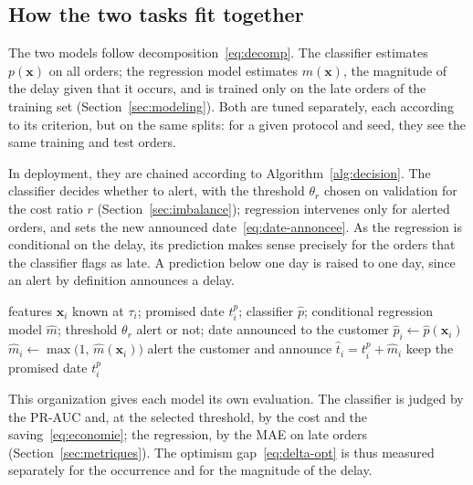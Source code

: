 \documentclass[11pt,a4paper]{article}
\theoremstyle{definition}
\begin{document}
\subsection{How the two tasks fit together}
\label{sec:articulation}

The two models follow decomposition~\eqref{eq:decomp}. The classifier estimates $p(\mathbf{x})$ on all orders; the regression model estimates $m(\mathbf{x})$, the magnitude of the delay given that it occurs, and is trained only on the late orders of the training set (Section~\ref{sec:modeling}). Both are tuned separately, each according to its criterion, but on the same splits: for a given protocol and seed, they see the same training and test orders.

In deployment, they are chained according to Algorithm~\ref{alg:decision}. The classifier decides whether to alert, with the threshold $\theta_r$ chosen on validation for the cost ratio $r$ (Section~\ref{sec:imbalance}); regression intervenes only for alerted orders, and sets the new announced date~\eqref{eq:date-annoncee}. As the regression is conditional on the delay, its prediction makes sense precisely for the orders that the classifier flags as late. A prediction below one day is raised to one day, since an alert by definition announces a delay.

\begin{algorithm}[!htbp]
\caption{Decision for an order at prediction time}
\label{alg:decision}
\begin{algorithmic}[1]
\Require features $\mathbf{x}_i$ known at $\tau_i$; promised date $t_i^{p}$; classifier $\hat{p}$; conditional regression model $\hat{m}$; threshold $\theta_r$
\Ensure alert or not; date announced to the customer
\State $\hat{p}_i \gets \hat{p}(\mathbf{x}_i)$
 
  \State $\hat{m}_i \gets \max\bigl(1,\, \hat{m}(\mathbf{x}_i)\bigr)$ 
  \State alert the customer and announce $\hat{t}_i = t_i^{p} + \hat{m}_i$ 
\Else
  \State keep the promised date $t_i^{p}$
\EndIf
\end{algorithmic}
\end{algorithm}

This organization gives each model its own evaluation. The classifier is judged by the PR-AUC and, at the selected threshold, by the cost and the saving~\eqref{eq:economie}; the regression, by the MAE on late orders (Section~\ref{sec:metriques}). The optimism gap~\eqref{eq:delta-opt} is thus measured separately for the occurrence and for the magnitude of the delay.
\end{document}
